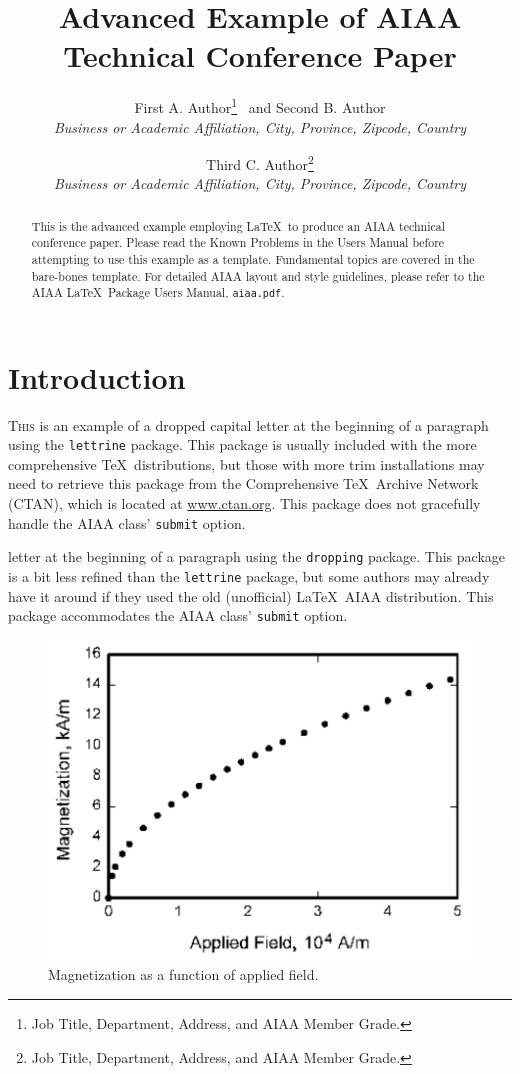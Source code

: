 \documentclass[]{aiaa-tc}%
\title{Advanced Example of AIAA Technical Conference Paper}
\author{
  First A. Author\thanks{Job Title, Department, Address, and AIAA Member Grade.}
  \ and Second B. Author\thanksibid{1}\\
  {\normalsize\itshape
   Business or Academic Affiliation, City, Province, Zipcode, Country}\\
  \and
  Third C. Author\thanks{Job Title, Department, Address,
                         and AIAA Member Grade.}\\
  {\normalsize\itshape
  Business or Academic Affiliation, City, Province, Zipcode, Country}
 }
\newcommand{\package}[1]{\texttt{#1}}
\newcommand{\file}[1]{\texttt{#1}}
\begin{document}
\maketitle

\begin{abstract}
This is the advanced example employing \LaTeX\ to produce an AIAA
technical conference paper.
Please read the Known Problems in the Users Manual before attempting
to use this example as a template.
Fundamental topics are covered in the bare-bones template.
For detailed AIAA layout and style guidelines, please refer to the AIAA
\LaTeX\ Package Users Manual, \file{aiaa.pdf}.
\end{abstract}

\printglossary%

\section{Introduction}

\lettrine[nindent=0pt]{T}{his} is an example of a dropped capital letter
at the beginning of a paragraph using the \package{lettrine} package.
This package is usually included with the more comprehensive \TeX\
distributions, but those with more trim installations may need to
retrieve this package from the Comprehensive \TeX\ Archive Network
(CTAN), which is located at \href{http://www.ctan.org}{www.ctan.org}.
This package does not gracefully handle the AIAA class' \verb|submit|
option.

letter at the beginning of a paragraph using the \package{dropping}
package.
This package is a bit less refined than the \package{lettrine} package,
but some authors may already have it around if they used the old
(unofficial) \LaTeX\ AIAA distribution.
This package accommodates the AIAA class' \verb|submit| option.

\begin{figure}
 \includegraphics{figure_magnet}
 \caption{Magnetization as a function of applied field.}
 \label{f:magnetic_field}
\end{figure}
\end{document}
